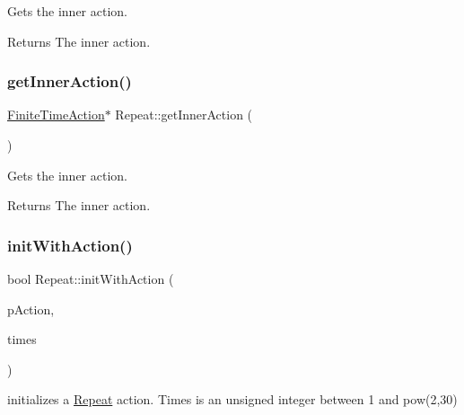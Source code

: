 Gets the inner action.

\begin{DoxyReturn}{Returns}
The inner action. 
\end{DoxyReturn}
\mbox{\label{classRepeat_ad5fb2fc246a8ada68b97e0b3f3d64e30}} 
\subsubsection{\texorpdfstring{get\+Inner\+Action()}{getInnerAction()}\hspace{0.1cm}{\footnotesize\ttfamily [2/2]}}
{\footnotesize\ttfamily \hyperlink{classFiniteTimeAction}{Finite\+Time\+Action}$\ast$ Repeat\+::get\+Inner\+Action (\begin{DoxyParamCaption}{ }\end{DoxyParamCaption})\hspace{0.3cm}{\ttfamily [inline]}}

Gets the inner action.

\begin{DoxyReturn}{Returns}
The inner action. 
\end{DoxyReturn}
\mbox{\label{classRepeat_a26f37537ecb708cb71f81f681d390965}} 
\subsubsection{\texorpdfstring{init\+With\+Action()}{initWithAction()}\hspace{0.1cm}{\footnotesize\ttfamily [1/2]}}
{\footnotesize\ttfamily bool Repeat\+::init\+With\+Action (\begin{DoxyParamCaption}\item[{\hyperlink{classFiniteTimeAction}{Finite\+Time\+Action} $\ast$}]{p\+Action,  }\item[{unsigned int}]{times }\end{DoxyParamCaption})}

initializes a \hyperlink{classRepeat}{Repeat} action. Times is an unsigned integer between 1 and pow(2,30) \mbox{\label{classRepeat_a26f37537ecb708cb71f81f681d390965}} 
